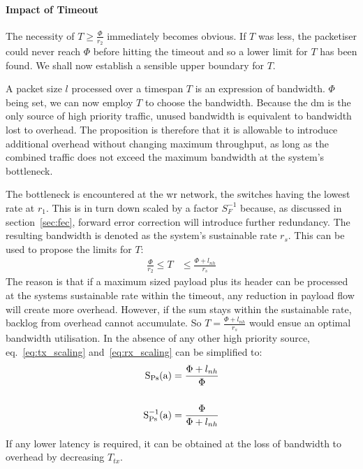 \paragraph{Impact of Timeout}
The necessity of  $T \ge \frac{\Phi}{r_2}$ immediately becomes obvious. If $T$ was less, the packetiser could never reach $\Phi$ before hitting the timeout and so a lower limit for $T$ has been found.
We shall now establish a sensible upper boundary for $T$.
\par
A packet size $l$ processed over a timespan $T$ is an expression of bandwidth. $\Phi$ being set, we can now employ $T$ to choose the bandwidth.
Because the \gls{dm} is the only source of high priority traffic, unused bandwidth is equivalent to bandwidth lost to overhead.
The proposition is therefore that it is allowable to introduce additional overhead without changing maximum throughput, as long as the combined traffic does not exceed the maximum bandwidth at the system's bottleneck.
\par
The bottleneck is encountered at the \gls{wr} network, the switches having the lowest rate at $r_1$. This is in turn down scaled by a factor $S^{-1}_F$ because, as discussed in section~\ref{sec:fec},
forward error correction will introduce further redundancy. The resulting bandwidth is denoted as the system's sustainable rate $r_s$.
This can be used to propose the limits for $T$:
%
\begin{align}
\frac{\Phi}{r_2} \le T &\le \frac{\Phi + l_{nh}}{r_s}
\end{align}
%
The reason is that if a maximum sized payload plus its header can be processed at the systems sustainable rate within the timeout,
any reduction in payload flow will create more overhead. However, if the sum stays within the sustainable rate, backlog from overhead cannot accumulate.
So $T = \frac{\Phi + l_{nh}}{r_s}$ would ensue an optimal bandwidth utilisation. In the absence of any other high priority source, eq.~\ref{eq:tx_scaling} and~\ref{eq:rx_scaling} can be simplified to:
\begin{align}
\mathrm{S_{Ps}(a)}      &=  \frac{\Phi + l_{nh}}{\Phi} \label{eq:simple_tx_scaling}\\
\notag\\
\mathrm{S^{-1}_{Ps}(a)} &=  \frac{\Phi}{\Phi + l_{nh}}  \label{eq:simple_rx_scaling}
\end{align}

If any lower latency is required, it can be obtained at the loss of bandwidth to overhead by decreasing $T_{tx}$.

